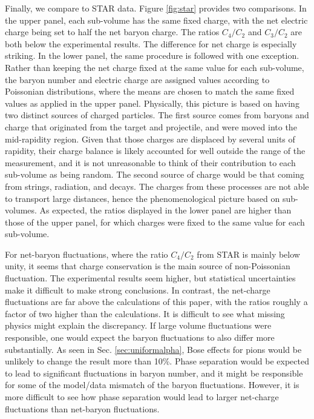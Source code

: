 Finally, we compare to STAR data. Figure \ref{fig:star} provides two comparisons. In the upper panel, each sub-volume has the same fixed charge, with the net electric charge being set to half the net baryon charge. The ratios $C_4/C_2$ and $C_3/C_2$ are both below the experimental results. The difference for net charge is especially striking. In the lower panel, the same procedure is followed with one exception. Rather than keeping the net charge fixed at the same value for each sub-volume, the baryon number and electric charge are assigned values according to Poissonian distributions, where the means are chosen to match the same fixed values as applied in the upper panel. Physically, this picture is based on having two distinct sources of charged particles. The first source comes from baryons and charge that originated from the target and projectile, and were moved into the mid-rapidity region. Given that those charges are displaced by several units of rapidity, their charge balance is likely accounted for well outside the range of the measurement, and it is not unreasonable to think of their contribution to each sub-volume as being random. The second source of charge would be that coming from strings, radiation, and decays. The charges from these processes are not able to transport large distances, hence the phenomenological picture based on sub-volumes. As expected, the ratios displayed in the lower panel are higher than those of the upper panel, for which charges were fixed to the same value for each sub-volume.

For net-baryon fluctuations, where the ratio $C_4/C_2$ from STAR is mainly below unity, it seems that charge conservation is the main source of non-Poissonian fluctuation. The experimental results seem higher, but statistical uncertainties make it difficult to make strong conclusions. In contrast, the net-charge fluctuations are far above the calculations of this paper, with the ratios roughly a factor of two higher than the calculations. It is difficult to see what missing physics might explain the discrepancy. If large volume fluctuations were responsible, one would expect the baryon fluctuations to also differ more substantially. As seen in Sec. \ref{sec:uniformalpha}, Bose effects for pions would be unlikely to change the result more than 10\%. Phase separation would be expected to lead to significant fluctuations in baryon number, and it might be responsible for some of the model/data mismatch of the baryon fluctuations. However, it is more difficult to see how phase separation would lead to larger net-charge fluctuations than net-baryon fluctuations.

